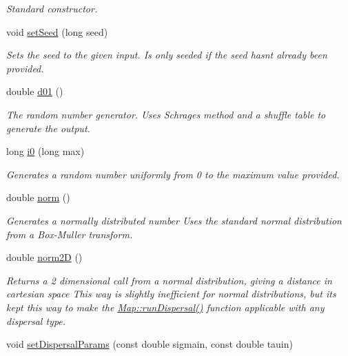 \begin{DoxyCompactItemize}
\begin{DoxyCompactList}\small\item\em Standard constructor. \end{DoxyCompactList}\item 
void \hyperlink{class_n_rrand_a23325b4d35ee0b5b580726db05e2b8a3}{set\+Seed} (long seed)
\begin{DoxyCompactList}\small\item\em Sets the seed to the given input. Is only seeded if the seed hasn\textquotesingle{}t already been provided. \end{DoxyCompactList}\item 
double \hyperlink{class_n_rrand_a0043ba1c33b3dcb3b98210fb432f9f6c}{d01} ()
\begin{DoxyCompactList}\small\item\em The random number generator. Uses Schrage\textquotesingle{}s method and a shuffle table to generate the output. \end{DoxyCompactList}\item 
long \hyperlink{class_n_rrand_a68fb3474c8f51ef5c61adf2cc499c61c}{i0} (long max)
\begin{DoxyCompactList}\small\item\em Generates a random number uniformly from 0 to the maximum value provided. \end{DoxyCompactList}\item 
double \hyperlink{class_n_rrand_aa57a6e9bae94c2df5a00473ba6fa900d}{norm} ()
\begin{DoxyCompactList}\small\item\em Generates a normally distributed number Uses the standard normal distribution from a Box-\/\+Muller transform. \end{DoxyCompactList}\item 
double \hyperlink{class_n_rrand_a754e5083299d12c1b33e8c66519d057e}{norm2D} ()
\begin{DoxyCompactList}\small\item\em Returns a 2 dimensional call from a normal distribution, giving a distance in cartesian space This way is slightly inefficient for normal distributions, but it\textquotesingle{}s kept this way to make the \hyperlink{class_map_a7c5b0623134a33511d7c17626c967176}{Map\+::run\+Dispersal()} function applicable with any dispersal type. \end{DoxyCompactList}\item 
void \hyperlink{class_n_rrand_a5679f458940de730f527772ca27db5ad}{set\+Dispersal\+Params} (const double sigmain, const double tauin)

\end{DoxyCompactItemize}
